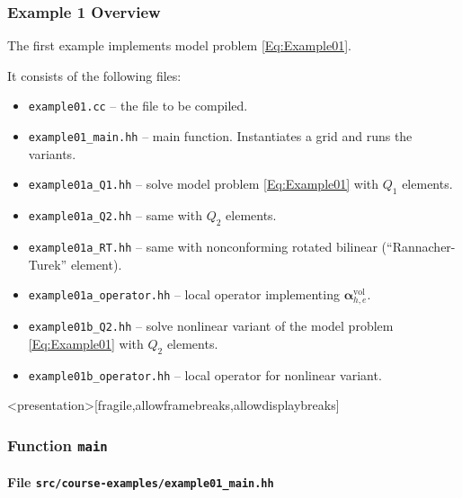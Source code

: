 \begin{frame}
\frametitle{Example 1 Overview}
The first example implements model problem \eqref{Eq:Example01}.

It consists of the following files:
\begin{itemize}
\item \lstinline{example01.cc} -- the file to be compiled. 
\item \lstinline{example01_main.hh} -- main function. Instantiates a grid and runs the variants.
\item \lstinline{example01a_Q1.hh} -- solve model problem \eqref{Eq:Example01} with $Q_1$ elements.
\item \lstinline{example01a_Q2.hh} -- same with $Q_2$ elements.
\item \lstinline{example01a_RT.hh} -- same with nonconforming rotated bilinear (``Rannacher-Turek'' element).
\item \lstinline{example01a_operator.hh} -- local operator implementing $\bm{\alpha}_{h,e}^{\text{vol}}$.
\item \lstinline{example01b_Q2.hh} -- solve nonlinear variant of the model problem \eqref{Eq:Example01} with $Q_2$ elements.
\item \lstinline{example01b_operator.hh} -- local operator for nonlinear variant.
\end{itemize}
\end{frame}

\begin{frame}<presentation>[fragile,allowframebreaks,allowdisplaybreaks]
\frametitle<presentation>{Function \lstinline{main}}
\framesubtitle<presentation>{File \texttt{src/course-examples/example01\_main.hh}}

\end{frame}



